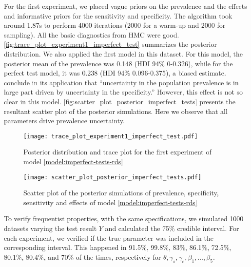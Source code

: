 For the first experiment, we placed vague priors on the prevalence and the
effects and informative priors for the sensitivity and specificity. The
algorithm took around 1.87s to perform 4000 iterations  (2000 for a warm-up
and 2000 for sampling). All the basic diagnostics from HMC were good.
\autoref{fig:trace_plot_experiment1_imperfect_test} summarizes the posterior
distribution. We also applied the first model in this dataset. For this model,
the posterior mean of the prevalence was 0.148 (HDI 94\% 0-0.326), while for
the perfect test model, it was 0.238 (HDI 94\% 0.096-0.375), a biased
estimate. \textcite[p. 1271]{gelman2020bayesian} conclude in its application
that ``uncertainty in the population prevalence is in large part driven by
uncertainty in the specificity.'' However, this effect is not so clear in
this model. \autoref{fig:scatter_plot_posterior_imperfect_tests} presents the
resultant scatter plot of the posterior simulations. Here we observe that all
parameters drive prevalence uncertainty.

\begin{figure}[ht]
  \centering
  \caption{\label{fig:trace_plot_experiment1_imperfect_test}Posterior distribution
    and trace plot for the first experiment of model
    \eqref{model:imperfect-tests-rds}}
  \texttt{[image: trace\_plot\_experiment1\_imperfect\_test.pdf]}
\end{figure}

\begin{figure}[ht]
  \centering
  \caption{\label{fig:scatter_plot_posterior_imperfect_tests} Scatter plot of
    the posterior simulations of prevalence, specificity, sensitivity and effects of model
    \eqref{model:imperfect-tests-rds}}
  \texttt{[image: scatter\_plot\_posterior\_imperfect\_tests.pdf]}
\end{figure}

To verify frequentist properties, with the same specifications,
we simulated 1000 datasets varying the test result $Y$ and calculated the
75\% credible interval. For each experiment, we
verified if the true parameter was included in the corresponding interval.
This happened in 91.5\%, 99.8\%, 83\%, 86.1\%, 72.5\%, 80.1\%, 80.4\%, and 70\% of the
times, respectively for $\theta, \gamma_s, \gamma_e, \beta_1, \dots, \beta_5$.

